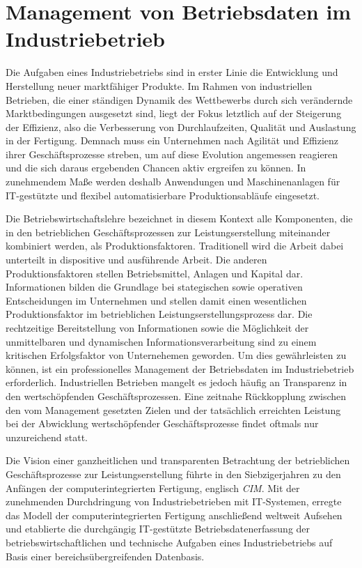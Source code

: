 \section{Management von Betriebsdaten im Industriebetrieb}\label{sec:usecase}
Die Aufgaben eines Industriebetriebs sind in erster Linie die Entwicklung und Herstellung neuer marktfähiger Produkte. 
Im Rahmen von industriellen Betrieben, die einer ständigen Dynamik des Wettbewerbs durch sich verändernde Marktbedingungen ausgesetzt sind, liegt der Fokus letztlich auf der Steigerung der Effizienz, also die Verbesserung von Durchlaufzeiten, Qualität und Auslastung in der Fertigung.
\cite{Erlach.2010}
Demnach muss ein Unternehmen nach Agilität und Effizienz ihrer Geschäftsprozesse streben, um auf diese Evolution angemessen reagieren und die sich daraus ergebenden Chancen aktiv ergreifen zu können.
 In zunehmendem Maße werden deshalb Anwendungen und Maschinenanlagen für \ac{IT}-gestützte und flexibel automatisierbare Produktionsabläufe eingesetzt. 
\cite{Erlach.2010}

Die Betriebswirtschaftslehre bezeichnet in diesem Kontext alle Komponenten, die in den betrieblichen Geschäftsprozessen zur Leistungserstellung miteinander kombiniert werden, als Produktionsfaktoren. 
Traditionell wird die Arbeit dabei unterteilt in dispositive und ausführende Arbeit. Die anderen Produktionsfaktoren stellen Betriebsmittel, Anlagen und Kapital dar.
\cite{Kanel.2018}
Informationen bilden die Grundlage bei stategischen sowie operativen Entscheidungen im Unternehmen und stellen damit einen wesentlichen Produktionsfaktor im betrieblichen Leistungserstellungsprozess dar.
\cite{Scheer.1990}
Die rechtzeitige Bereitstellung von Informationen sowie die Möglichkeit der unmittelbaren und dynamischen Informationsverarbeitung sind zu einem kritischen Erfolgsfaktor von Unternehemen geworden. 
Um dies gewährleisten zu können, ist ein professionelles Management der Betriebsdaten im Industriebetrieb erforderlich.
\cite{Dippold.2005}
Industriellen Betrieben mangelt es jedoch häufig an Transparenz in den wertschöpfenden Geschäftsprozessen.
Eine zeitnahe Rückkopplung zwischen den vom Management gesetzten Zielen und der tatsächlich erreichten Leistung bei der Abwicklung wertschöpfender Geschäftsprozesse findet oftmals nur unzureichend statt. 
\cite{Grauer.2019}

Die Vision einer ganzheitlichen und transparenten Betrachtung der betrieblichen Geschäftsprozesse zur Leistungserstellung führte in den Siebzigerjahren zu den Anfängen der computerintegrierten Fertigung, englisch \textit{\acf{CIM}}. 
Mit der zunehmenden Durchdringung von Industriebetrieben mit \ac{IT}-Systemen, erregte das Modell der computerintegrierten Fertigung anschließend weltweit Aufsehen und etablierte die durchgängig \ac{IT}-gestützte Betriebsdatenerfassung der betriebswirtschaftlichen und technische Aufgaben eines Industriebetriebs auf Basis einer bereichsübergreifenden Datenbasis.
\cite{Scheer.1990}

